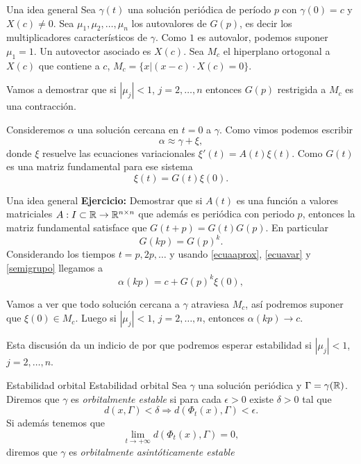  


 
 {Una idea general  }
Sea $\gamma(t)$ una solución periódica de período $p$ con $\gamma(0)=c$ y $X(c)\neq 0$. Sea $\mu_1,\mu_2,\dots,\mu_n$ los autovalores de $G(p)$, 
es decir los
multiplicadores característicos de $\gamma$. Como $1$ es autovalor, podemos suponer $\mu_1=1$. Un autovector asociado es $X(c)$. Sea $M_c$ el hiperplano ortogonal a $X(c)$
que contiene a $c$, $M_c=\{x|(x-c)\cdot X(c)=0\}$. 

Vamos a demostrar  que si $|\mu_j|<1$, $j=2,\ldots,n$ entonces $G(p)$ restrigida a $M_c$ es una contracción.

Consideremos $\alpha$ una solución cercana en $t=0$ a $\gamma$. Como vimos podemos escribir 
\begin{equation}\label{ecuaaprox}
 \alpha\approx \gamma+\xi,
\end{equation}
 donde $\xi$ resuelve las ecuaciones 
variacionales $\xi'(t)=A(t)\xi(t)$. Como $G(t)$ es una matriz fundamental para ese sistema 
\begin{equation}\label{ecuavar}
 \xi(t)=G(t)\xi(0). 
\end{equation}





 {Una idea general  }
\textbf{Ejercicio:} Demostrar que si $A(t)$ es una función a valores matriciales $A:I\subset\mathbb{R}\to\mathbb{R}^{n\times n}$ que además es periódica con periodo $p$, 
entonces la matriz fundamental satisface que $G(t+p)=G(t)G(p)$. En particular 
\begin{equation}\label{semigrupo}G(kp)=G(p)^k.\end{equation}
Considerando los tiempos $t=p,2p,\ldots$ y usando \eqref{ecuaaprox}, \eqref{ecuavar} y \eqref{semigrupo} llegamos a
\[\alpha(kp)=c+G(p)^k\xi(0),\]

Vamos a ver que todo solución cercana a $\gamma$ atraviesa $M_c$, así podremos suponer que $\xi(0)\in M_c$. Luego si $|\mu_j|<1$, $j=2,\ldots,n$, 
entonces $\alpha(kp)\to c$. 

Esta discusión da un indicio de por que podremos esperar estabilidad si  $|\mu_j|<1$, $j=2,\ldots,n$.






 {Estabilidad orbital }
{Estabilidad orbital}
 Sea $\gamma$ una solución periódica y $\Gamma=\gamma(\mathbb{R})$. Diremos que $\gamma$ es \emph{orbitalmente estable} si para cada $\epsilon>0$ existe $\delta>0$ tal que
 \[d(x,\Gamma)<\delta\Rightarrow d(\Phi_t(x),\Gamma)<\epsilon.\]
 Si además tenemos que
  \[\lim_{t\to +\infty}d(\Phi_t(x),\Gamma)=0,\]
  diremos que $\gamma$ es \emph{orbitalmente asintóticamente estable}




